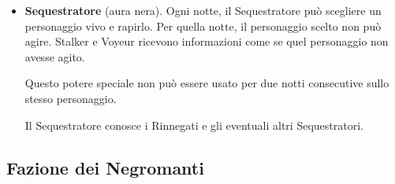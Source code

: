 \documentclass[a4paper,10pt]{article}
\begin{document}
\begin{itemize}
 \item {\bf Sequestratore} (aura nera). Ogni notte, il Sequestratore può scegliere un personaggio vivo e rapirlo. Per quella notte, il personaggio scelto non può agire.
 Stalker e Voyeur ricevono informazioni come se quel personaggio non avesse agito.
 
 Questo potere speciale non può essere usato per due notti consecutive sullo stesso personaggio.
 
 Il Sequestratore conosce i Rinnegati e gli eventuali altri Sequestratori.


\end{itemize}

\subsection*{Fazione dei Negromanti}
\end{document}
